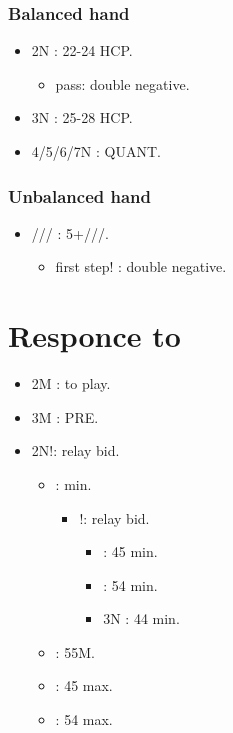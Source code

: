 \documentclass[12pt,twoside,a5paper]{report}%
\begin{document}
		\subsection*{Balanced hand}
			\begin{itemize}
			\renewcommand{\labelitemi}{}
				\item 2N : 22-24 HCP.
				\begin{itemize}
				\renewcommand{\labelitemi}{--}
					\item pass: double negative.
				\end{itemize}
				\item 3N : 25-28 HCP.
				\item 4/5/6/7N : QUANT.
			\end{itemize}

		\subsection*{Unbalanced hand}
			\begin{itemize}
			\renewcommand{\labelitemi}{}
				\item {}/// : 5+\he{}/\sp{}/\cl{}/\di{}.
				\begin{itemize}
				\renewcommand{\labelitemi}{--}
					\item first step! : double negative.
				\end{itemize}
			\end{itemize}

\chapter*{Responce to }
		\begin{itemize}
		\renewcommand{\labelitemi}{}	
		\item 2M : to play.
		\item 3M : PRE.
		\item 2N!: relay bid.
			\begin{itemize}
			\renewcommand{\labelitemi}{--}
			\item {} : min.
				\begin{itemize}
				\renewcommand{\labelitemi}{--}
					\item {}!: relay bid.
						\begin{itemize}
						\renewcommand{\labelitemi}{--}
						\item {} : 4\sp{}5\he{} min.
						\item {} : 5\sp{}4\he{} min.
						\item 3N : 4\sp{}4\he{} min.
						\end{itemize}
				\end{itemize}
			\item {} : 55M.
			\item {} : 4\sp{}5\he{} max.
			\item {} : 5\sp{}4\he{} max.
			\end{itemize}
		\end{itemize}
\end{document}
